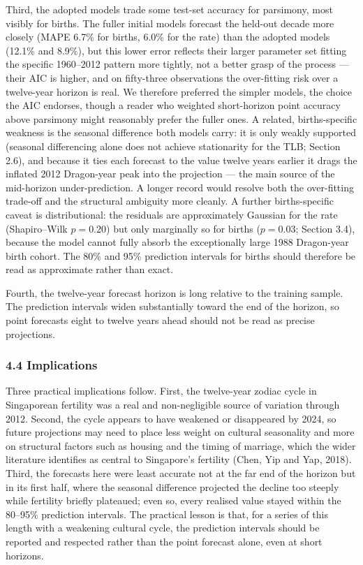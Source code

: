 \documentclass[
  11pt,
]{article}
\begin{document}
Third, the adopted models trade some test-set accuracy for parsimony,
most visibly for births. The fuller initial models forecast the held-out
decade more closely (MAPE 6.7\% for births, 6.0\% for the rate) than the
adopted models (12.1\% and 8.9\%), but this lower error reflects their
larger parameter set fitting the specific 1960--2012 pattern more
tightly, not a better grasp of the process --- their AIC is higher, and
on fifty-three observations the over-fitting risk over a twelve-year
horizon is real. We therefore preferred the simpler models, the choice
the AIC endorses, though a reader who weighted short-horizon point
accuracy above parsimony might reasonably prefer the fuller ones. A
related, births-specific weakness is the seasonal difference both models
carry: it is only weakly supported (seasonal differencing alone does not
achieve stationarity for the TLB; Section 2.6), and because it ties each
forecast to the value twelve years earlier it drags the inflated 2012
Dragon-year peak into the projection --- the main source of the
mid-horizon under-prediction. A longer record would resolve both the
over-fitting trade-off and the structural ambiguity more cleanly. A
further births-specific caveat is distributional: the residuals are
approximately Gaussian for the rate (Shapiro--Wilk \(p = 0.20\)) but
only marginally so for births (\(p = 0.03\); Section 3.4), because the
model cannot fully absorb the exceptionally large 1988 Dragon-year birth
cohort. The 80\% and 95\% prediction intervals for births should
therefore be read as approximate rather than exact.

Fourth, the twelve-year forecast horizon is long relative to the
training sample. The prediction intervals widen substantially toward the
end of the horizon, so point forecasts eight to twelve years ahead
should not be read as precise projections.

\subsubsection{4.4 Implications}\label{implications}

Three practical implications follow. First, the twelve-year zodiac cycle
in Singaporean fertility was a real and non-negligible source of
variation through 2012. Second, the cycle appears to have weakened or
disappeared by 2024, so future projections may need to place less weight
on cultural seasonality and more on structural factors such as housing
and the timing of marriage, which the wider literature identifies as
central to Singapore's fertility (Chen, Yip and Yap, 2018). Third, the
forecasts here were least accurate not at the far end of the horizon but
in its first half, where the seasonal difference projected the decline
too steeply while fertility briefly plateaued; even so, every realised
value stayed within the 80--95\% prediction intervals. The practical
lesson is that, for a series of this length with a weakening cultural
cycle, the prediction intervals should be reported and respected rather
than the point forecast alone, even at short horizons.
\end{document}
